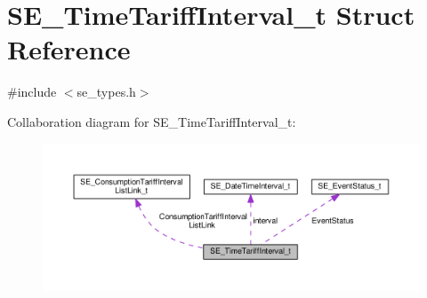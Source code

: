 \hypertarget{structSE__TimeTariffInterval__t}{}\section{S\+E\+\_\+\+Time\+Tariff\+Interval\+\_\+t Struct Reference}
\label{structSE__TimeTariffInterval__t}


{\ttfamily \#include $<$se\+\_\+types.\+h$>$}



Collaboration diagram for S\+E\+\_\+\+Time\+Tariff\+Interval\+\_\+t\+:\nopagebreak
\begin{figure}[H]
\begin{center}
\leavevmode
\includegraphics[width=350pt]{structSE__TimeTariffInterval__t__coll__graph}
\end{center}
\end{figure}
